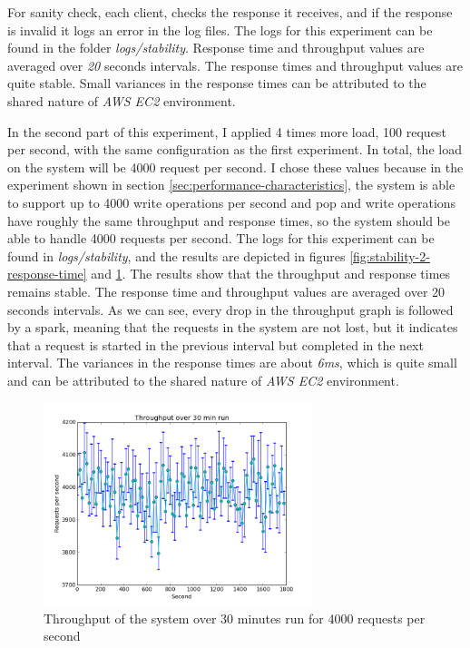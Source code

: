\documentclass[11pt]{article}
\begin{document}
For sanity check, each client, checks the response it receives, and 
if the response is invalid it logs an error in the log files. 
The logs for this experiment can be found in the folder \emph{logs/stability}.
Response time and throughput values are averaged over \emph{20} seconds intervals.
The response times and throughput values are quite stable. Small variances in the 
response times can be attributed to the shared nature of \emph{AWS EC2} environment.

In the second part of this experiment, I applied 4 times more load, 100 request per second,
with the same configuration as the first experiment. In total, the load on the 
system will be 4000 request per second. I chose these values because in the experiment
shown in section \ref{sec:performance-characteristics}, the system is able to 
support up to 4000 write operations per second and pop and write operations have roughly 
the same throughput and response times, so the system should be able to
handle 4000 requests per second. The logs for this experiment can be found in 
\emph{logs/stability}, and the results are depicted in figures \ref{fig:stability-2-response-time}
and \ref{fig:stability-2-throughput}. The results show that the throughput and 
response times remains stable. The response time and throughput values are 
averaged over 20 seconds intervals. As we can see, every drop in the 
throughput graph is followed by a spark, meaning that the requests in the 
system are not lost, but it indicates that a request is started in the 
previous interval but completed in the next interval. The variances in the 
response times are about \emph{6ms}, which is quite small and can be attributed 
to the shared nature of \emph{AWS EC2} environment.

\begin{figure}[H]
  \includegraphics[width=0.7\textwidth,page=1]{figures/stability_throughput_2}
  \centering
  \caption{Throughput of the system over 30 minutes run for 4000 requests per second}
  \label{fig:stability-2-throughput}
\end{figure}
\end{document}
